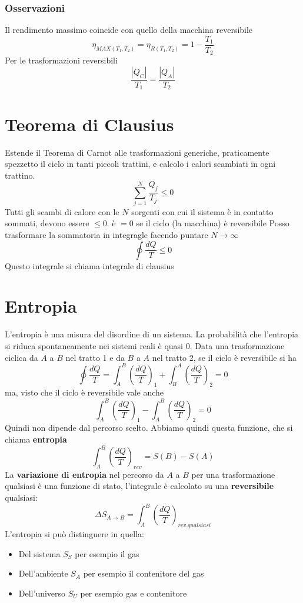 \documentclass[a4paper]{report}
\begin{document}
  \subsubsection{Osservazioni}
  Il rendimento massimo coincide con quello della macchina reversibile
  $$ \eta_{MAX(T_1,T_2)} = \eta_{R(T_1,T_2)} = 1-\frac{T_1}{T_2} $$
  Per le trasformazioni reversibili
  $$ \frac{|Q_C|}{T_1} = \frac{|Q_A|}{T_2}$$

  \section{Teorema di Clausius}
  Estende il Teorema di Carnot alle trasformazioni generiche, praticamente spezzetto il ciclo in tanti piccoli trattini, e calcolo i calori scambiati in ogni trattino.
  $$ \sum_{j=1}^N \frac{Q_j}{T_j} \leq 0 $$
  Tutti gli scambi di calore con le $N$ sorgenti con cui il sistema è in contatto sommati, devono essere $\leq 0$. è $=0$ se il ciclo (la macchina) è reversibile
  Posso trasformare la sommatoria in integragle facendo puntare $N \rightarrow \infty$
  $$ \oint \frac{dQ}{T} \leq 0 $$
  Questo integrale si chiama integrale di clausius

  \section{Entropia}
  L'entropia è una misura del disordine di un sistema. La probabilità che l'entropia si riduca spontaneamente nei sistemi reali è quasi 0.
  Data una trasformazione ciclica da $A$ a $B$ nel tratto 1 e da $B$ a $A$ nel tratto 2, se il ciclo è reversibile si ha
  $$ \oint \frac{dQ}{T} = \int_A^B (\frac{dQ}{T})_1 + \int_B^A (\frac{dQ}{T})_2 = 0$$
  ma, visto che il ciclo è reversibile vale anche
  $$ \int_A^B (\frac{dQ}{T})_1 - \int_A^B (\frac{dQ}{T})_2 = 0$$
  Quindi non dipende dal percorso scelto. Abbiamo quindi questa funzione, che si chiama \textbf{entropia}
  $$ \int_A^B (\frac{dQ}{T})_{rev} = S(B) -S(A) $$
  La \textbf{variazione di entropia} nel percorso da $A$ a $B$ per una trasformazione qualsiasi è una funzione di stato, l'integrale è calcolato su una \textbf{reversibile} qualsiasi:
  $$ \Delta S_{A \rightarrow B} = \int_A^B (\frac{dQ}{T})_{rev. qualsiasi} $$
  L'entropia si può distinguere in quella:
  \begin{itemize}
    \item Del sistema $S_S$ per esempio il gas
    \item Dell'ambiente $S_A$ per esempio il contenitore del gas
    \item Dell'universo $S_U$ per esempio gas e contenitore
  \end{itemize}
\end{document}
